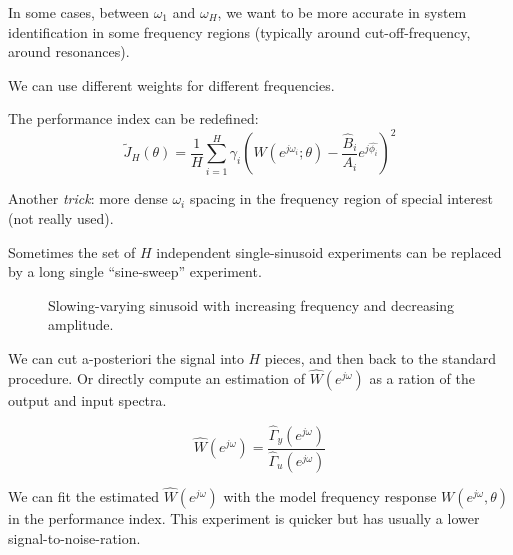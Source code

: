 
\begin{remark}
    In some cases, between $\omega_1$ and $\omega_H$, we want to be more accurate in system identification in some frequency regions (typically around cut-off-frequency, around resonances).

    We can use different weights for different frequencies.


    The performance index can be redefined:
    \[
        \tilde{J}_H (\theta) = \frac{1}{H} \sum_{i=1}^H \gamma_i \left(W(e^{j\omega_i};\theta) - \frac{\hat{B}_i}{A_i}e^{j\hat{\phi_i}}\right)^2
    \]

    Another \emph{trick}: more dense $\omega_i$ spacing in the frequency region of special interest (not really used).
\end{remark}

\begin{remark}
    Sometimes the set of $H$ independent single-sinusoid experiments can be replaced by a long single ``sine-sweep'' experiment.

    \begin{figure}[H]
        \centering
        \caption*{Slowing-varying sinusoid with increasing frequency and decreasing amplitude.}
    \end{figure}

    We can cut a-posteriori the signal into $H$ pieces, and then back to the standard procedure.
    Or directly compute an estimation of $\hat{W}(e^{j\omega})$ as a ration of the output and input spectra.

    \[
        \hat{W}(e^{j\omega}) = \frac{\hat{\Gamma}_y(e^{j\omega})}{\hat{\Gamma}_u(e^{j\omega})}
    \]

    We can fit the estimated $\hat{W}(e^{j\omega})$ with the model frequency response $W(e^{j\omega}, \theta)$ in the performance index.
    This experiment is quicker but has usually a lower signal-to-noise-ration.
\end{remark}

